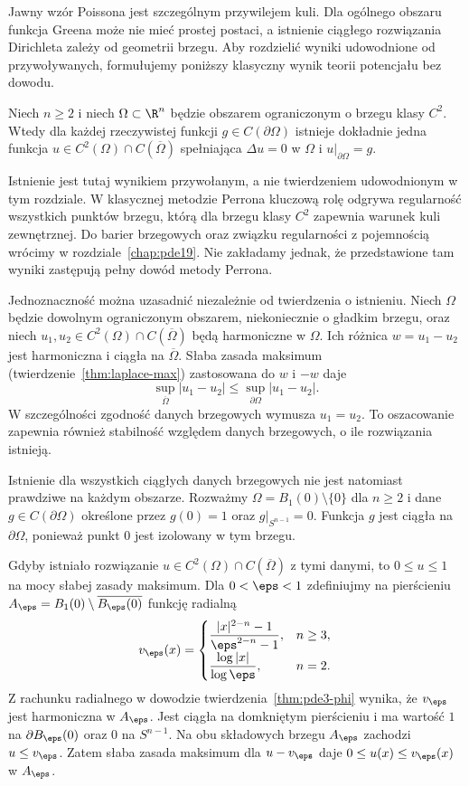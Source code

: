 Jawny wzór Poissona jest szczególnym przywilejem kuli.
Dla ogólnego obszaru funkcja Greena może nie mieć
prostej postaci, a istnienie ciągłego rozwiązania Dirichleta
zależy od geometrii brzegu. Aby rozdzielić wyniki
udowodnione od przywoływanych, formułujemy poniższy
klasyczny wynik teorii potencjału bez dowodu.

\begin{uwaga}
\label{prop:pde3-future}
Niech $n\geq2$ i niech $\Omega\subset\R^n$ będzie
obszarem ograniczonym o brzegu klasy $C^2$.
Wtedy dla każdej rzeczywistej funkcji
$g\in C(\partial\Omega)$ istnieje dokładnie jedna
funkcja $u\in C^2(\Omega)\cap C(\overline\Omega)$
spełniająca $\Delta u=0$ w $\Omega$ i
$u|_{\partial\Omega}=g$.

Istnienie jest tutaj wynikiem przywołanym, a nie
twierdzeniem udowodnionym w tym rozdziale.
W klasycznej metodzie Perrona kluczową rolę odgrywa
regularność wszystkich punktów brzegu, którą dla
brzegu klasy $C^2$ zapewnia warunek kuli zewnętrznej.
Do barier brzegowych oraz związku regularności
z pojemnością wrócimy w rozdziale~\ref{chap:pde19}.
Nie zakładamy jednak, że przedstawione tam wyniki
zastępują pełny dowód metody Perrona.
\end{uwaga}

Jednoznaczność można uzasadnić niezależnie od
twierdzenia o istnieniu. Niech $\Omega$ będzie
dowolnym ograniczonym obszarem, niekoniecznie
o gładkim brzegu, oraz niech $u_1,u_2\in
C^2(\Omega)\cap C(\overline\Omega)$ będą harmoniczne
w $\Omega$. Ich różnica $w=u_1-u_2$ jest harmoniczna
i ciągła na $\overline\Omega$.
Słaba zasada maksimum (twierdzenie~\ref{thm:laplace-max})
zastosowana do $w$ i $-w$ daje
\[
 \sup_{\overline\Omega}|u_1-u_2|
 \leq \sup_{\partial\Omega}|u_1-u_2|.
\]
W szczególności zgodność danych brzegowych
wymusza $u_1=u_2$.
To oszacowanie zapewnia również stabilność
względem danych brzegowych, o ile rozwiązania istnieją.

Istnienie dla wszystkich ciągłych danych brzegowych
nie jest natomiast prawdziwe na każdym obszarze.
Rozważmy $\Omega=B_1(0)\setminus\{0\}$ dla $n\geq2$
i dane $g\in C(\partial\Omega)$ określone przez
$g(0)=1$ oraz $g|_{S^{n-1}}=0$.
Funkcja $g$ jest ciągła na $\partial\Omega$,
ponieważ punkt $0$ jest izolowany w tym brzegu.

Gdyby istniało rozwiązanie $u\in C^2(\Omega)
\cap C(\overline\Omega)$ z tymi danymi, to
$0\leq u\leq1$ na mocy słabej zasady maksimum.
Dla $0<\eps<1$ zdefiniujmy na pierścieniu
$A_\eps=B_1(0)\setminus\overline{B_\eps(0)}$
funkcję radialną
\[
 v_\eps(x)=
 \begin{cases}
 \dfrac{|x|^{2-n}-1}{\eps^{2-n}-1},& n\geq3,\\[6pt]
 \dfrac{\log|x|}{\log\eps},& n=2.
 \end{cases}
\]
Z rachunku radialnego w dowodzie
twierdzenia~\ref{thm:pde3-phi} wynika, że $v_\eps$
jest harmoniczna w $A_\eps$. Jest ciągła na
domkniętym pierścieniu i ma wartość $1$ na
$\partial B_\eps(0)$ oraz $0$ na $S^{n-1}$.
Na obu składowych brzegu $A_\eps$ zachodzi
$u\leq v_\eps$. Zatem słaba zasada maksimum dla
$u-v_\eps$ daje $0\leq u(x)\leq v_\eps(x)$ w $A_\eps$.

